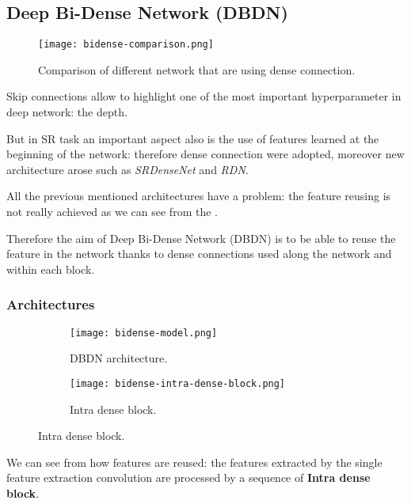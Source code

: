 \subsection{Deep Bi-Dense Network (DBDN\cite{DBDN})}
\begin{figure}
    \centering
    \texttt{[image: bidense-comparison.png]}
    \caption{Comparison of different network that are using dense connection.}\label{dbdn:comparison}
\end{figure}

Skip connections allow to highlight one of the most important hyperparameter in deep network: the depth.

But in SR task an important aspect also is the use of features learned at the beginning of the network: therefore dense connection were adopted, moreover new architecture arose such as \textit{SRDenseNet} and \textit{RDN}.

All the previous mentioned architectures have a problem: the feature reusing is not really achieved as we can see from the .

Therefore the aim of Deep Bi-Dense Network (DBDN) is to be able to reuse the feature in the network thanks to dense connections used along the network and within each block.

\subsubsection{Architectures}
\begin{figure}
    \begin{subfigure}{\textwidth}
        \centering
        \texttt{[image: bidense-model.png]}
        \caption{DBDN architecture.}\label{dbdn:architecture}            
    \end{subfigure}
    \begin{subfigure}{\textwidth}
        \centering
        \texttt{[image: bidense-intra-dense-block.png]}
        \caption{Intra dense block.}\label{dbdn:idb}   
    \end{subfigure}


\end{figure}

We can see from  how features are reused: the features extracted by the single feature extraction convolution are processed by a sequence of \textbf{Intra dense block}.

